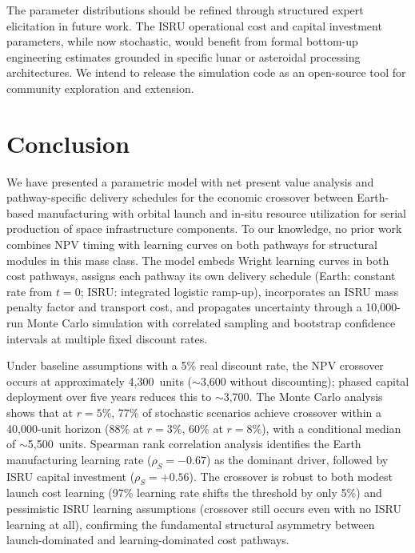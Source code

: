 \documentclass[preprint,12pt]{elsarticle}
\begin{document}
The parameter distributions should be refined through structured expert elicitation in future work. The ISRU operational cost and capital investment parameters, while now stochastic, would benefit from formal bottom-up engineering estimates grounded in specific lunar or asteroidal processing architectures. We intend to release the simulation code as an open-source tool for community exploration and extension.

\section{Conclusion}
\label{sec:conclusion}

We have presented a parametric model with net present value analysis and pathway-specific delivery schedules for the economic crossover between Earth-based manufacturing with orbital launch and in-situ resource utilization for serial production of space infrastructure components. To our knowledge, no prior work combines NPV timing with learning curves on both pathways for structural modules in this mass class. The model embeds Wright learning curves in both cost pathways, assigns each pathway its own delivery schedule (Earth: constant rate from $t = 0$; ISRU: integrated logistic ramp-up), incorporates an ISRU mass penalty factor and transport cost, and propagates uncertainty through a 10{,}000-run Monte Carlo simulation with correlated sampling and bootstrap confidence intervals at multiple fixed discount rates.

Under baseline assumptions with a 5\% real discount rate, the NPV crossover occurs at approximately 4{,}300~units ($\sim$3{,}600 without discounting); phased capital deployment over five years reduces this to $\sim$3{,}700. The Monte Carlo analysis shows that at $r = 5\%$, 77\% of stochastic scenarios achieve crossover within a 40{,}000-unit horizon (88\% at $r = 3\%$, 60\% at $r = 8\%$), with a conditional median of $\sim$5{,}500~units. Spearman rank correlation analysis identifies the Earth manufacturing learning rate ($\rho_S = -0.67$) as the dominant driver, followed by ISRU capital investment ($\rho_S = +0.56$). The crossover is robust to both modest launch cost learning (97\% learning rate shifts the threshold by only 5\%) and pessimistic ISRU learning assumptions (crossover still occurs even with no ISRU learning at all), confirming the fundamental structural asymmetry between launch-dominated and learning-dominated cost pathways.
\end{document}
